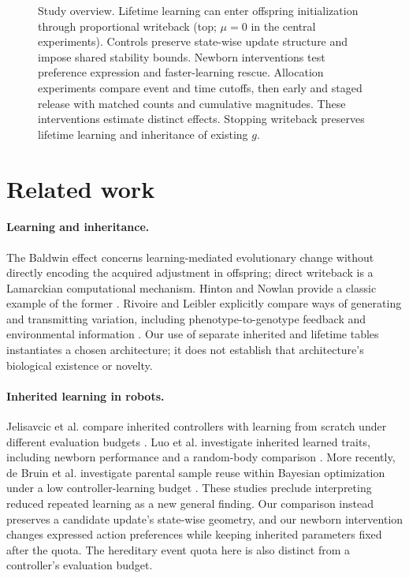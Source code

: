 \documentclass[11pt]{article}
\begin{document}
\begin{figure}[!htb]
\caption{Study overview. Lifetime learning can enter offspring initialization through proportional writeback (top; $\mu=0$ in the central experiments). Controls preserve state-wise update structure and impose shared stability bounds. Newborn interventions test preference expression and faster-learning rescue. Allocation experiments compare event and time cutoffs, then early and staged release with matched counts and cumulative magnitudes. These interventions estimate distinct effects. Stopping writeback preserves lifetime learning and inheritance of existing $g$.}
\label{fig:overview}
\end{figure}

\section{Related work}
\paragraph{Learning and inheritance.}
The Baldwin effect concerns learning-mediated evolutionary change without directly encoding the acquired adjustment in offspring; direct writeback is a Lamarckian computational mechanism. Hinton and Nowlan provide a classic example of the former \cite{hinton1987}. Rivoire and Leibler explicitly compare ways of generating and transmitting variation, including phenotype-to-genotype feedback and environmental information \cite{rivoire2014}. Our use of separate inherited and lifetime tables instantiates a chosen architecture; it does not establish that architecture's biological existence or novelty.

\paragraph{Inherited learning in robots.}
Jelisavcic et al. compare inherited controllers with learning from scratch under different evaluation budgets \cite{jelisavcic2019}. Luo et al. investigate inherited learned traits, including newborn performance and a random-body comparison \cite{luo2023}. More recently, de Bruin et al. investigate parental sample reuse within Bayesian optimization under a low controller-learning budget \cite{debruinSamples}. These studies preclude interpreting reduced repeated learning as a new general finding. Our comparison instead preserves a candidate update's state-wise geometry, and our newborn intervention changes expressed action preferences while keeping inherited parameters fixed after the quota. The hereditary event quota here is also distinct from a controller's evaluation budget.
\end{document}
